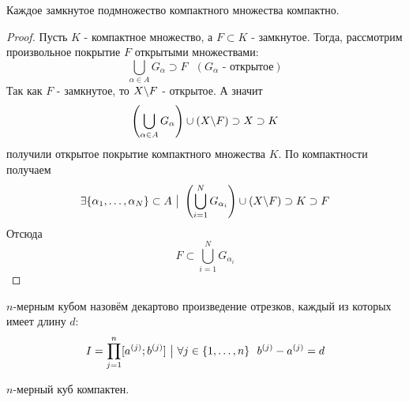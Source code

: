 \begin{theorem}
	Каждое замкнутое подмножество компактного множества компактно.
\end{theorem}

\begin{proof}
	Пусть $K$ - компактное множество, а $F \subset K$ - замкнутое. Тогда, рассмотрим произвольное покрытие $F$ открытыми множествами:
	\[
		\bigcup\limits_{\alpha \in A} G_\alpha \supset F\ \ \ (G_\alpha \text{ - открытое})
	\]
	Так как $F$ - замкнутое, то $X \backslash F$ - открытое. А значит
	\[
		\left(\bigcup\limits_{\alpha \in A} G_\alpha\right) \cup (X \backslash F) \supset X \supset K
	\]
	получили открытое покрытие компактного множества $K$. По компактности получаем
	\[
		\exists \{\alpha_1, \ldots, \alpha_N\} \subset A \ \big|\  \left(\bigcup\limits_{i = 1}^N G_{\alpha_i}\right) \cup (X \backslash F) \supset K \supset F
	\]
	Отсюда
	\[
		F \subset \bigcup\limits_{i = 1}^N G_{\alpha_i}
	\]
\end{proof}

\begin{definition}
	$n$-мерным кубом назовём декартово произведение отрезков, каждый из которых имеет длину $d$:
	\[
		I = \prod\limits_{j = 1}^n [a^{(j)}; b^{(j)}] \ \big|\  \forall j \in \{1, \ldots, n\}\ \ b^{(j)} - a^{(j)} = d
	\]
\end{definition}

\begin{theorem}
	$n$-мерный куб компактен.
\end{theorem}

